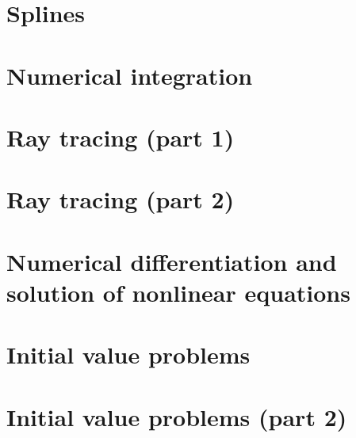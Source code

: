 \documentclass{article}
\begin{document}
\section{Splines}


\section{Numerical integration}


\section{Ray tracing (part 1)}


\section{Ray tracing (part 2)}


\section{Numerical differentiation and solution of nonlinear equations}


\section{Initial value problems}


\section{Initial value problems (part 2)}

\end{document}
